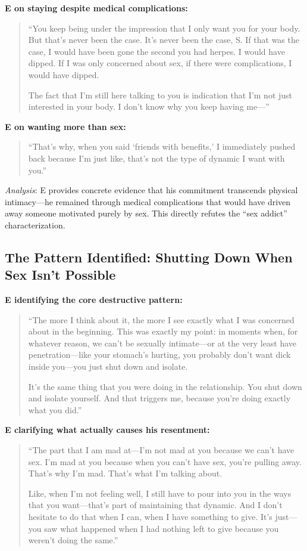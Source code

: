 \documentclass[12pt,openany]{book}
\numberwithin{equation}{chapter}
\begin{document}
\textbf{E on staying despite medical complications:}
\begin{quote}
``You keep being under the impression that I only want you for your body. But that's never been the case. It's never been the case, S. If that was the case, I would have been gone the second you had herpes. I would have dipped. If I was only concerned about sex, if there were complications, I would have dipped.

The fact that I'm still here talking to you is indication that I'm not just interested in your body. I don't know why you keep having me---''
\end{quote}

\textbf{E on wanting more than sex:}
\begin{quote}
``That's why, when you said `friends with benefits,' I immediately pushed back because I'm just like, that's not the type of dynamic I want with you.''
\end{quote}

\textit{Analysis}: E provides concrete evidence that his commitment transcends physical intimacy---he remained through medical complications that would have driven away someone motivated purely by sex. This directly refutes the ``sex addict'' characterization.

\subsection{The Pattern Identified: Shutting Down When Sex Isn't Possible}

\textbf{E identifying the core destructive pattern:}
\begin{quote}
``The more I think about it, the more I see exactly what I was concerned about in the beginning. This was exactly my point: in moments when, for whatever reason, we can't be sexually intimate---or at the very least have penetration---like your stomach's hurting, you probably don't want dick inside you---you just shut down and isolate.

It's the same thing that you were doing in the relationship. You shut down and isolate yourself. And that triggers me, because you're doing exactly what you did.''
\end{quote}

\textbf{E clarifying what actually causes his resentment:}
\begin{quote}
``The part that I am mad at---I'm not mad at you because we can't have sex. I'm mad at you because when you can't have sex, you're pulling away. That's why I'm mad. That's what I'm talking about.

Like, when I'm not feeling well, I still have to pour into you in the ways that you want---that's part of maintaining that dynamic. And I don't hesitate to do that when I can, when I have something to give. It's just---you saw what happened when I had nothing left to give because you weren't doing the same.''
\end{quote}
\end{document}

